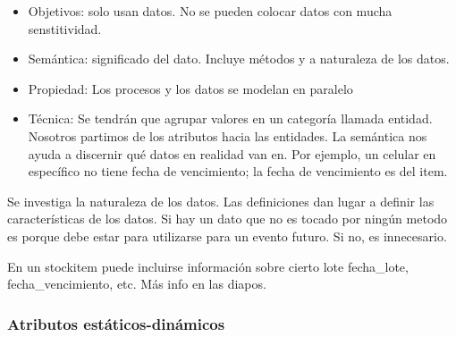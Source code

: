 \begin{itemize}
    \item Objetivos: solo usan datos. No se pueden colocar datos con mucha senstitividad. 
    \item Semántica: significado del dato. Incluye métodos y a naturaleza de los datos.
    \item Propiedad: Los procesos y los datos se modelan en paralelo
    \item Técnica: Se tendrán que agrupar valores en un categoría llamada entidad.
    Nosotros partimos de los atributos hacia las entidades. La semántica nos ayuda a discernir
    qué datos en realidad van en. Por ejemplo, un celular en específico 
    no tiene fecha de vencimiento; la fecha de vencimiento es del item. 
    
\end{itemize}

Se investiga la naturaleza de los datos. Las definiciones dan lugar a 
definir las características de los datos. Si hay un dato que no es tocado por ningún metodo
es porque debe estar para utilizarse para un evento futuro. Si no, es innecesario. 

En un stockitem puede incluirse información sobre cierto lote
fecha\_lote, fecha\_vencimiento, etc. 
Más info en las diapos.

\subsubsection*{Atributos estáticos-dinámicos}